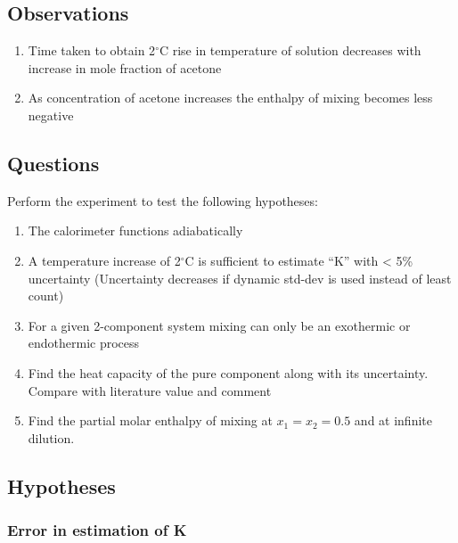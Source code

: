 \documentclass[11pt]{article}
\providecommand{\tightlist}{%
      \setlength{\itemsep}{0pt}\setlength{\parskip}{0pt}}
\begin{document}
\hypertarget{observations}{%
  \subsection{Observations}\label{observations}}

\begin{enumerate}
  \def\labelenumi{\arabic{enumi}.}
  \tightlist
  \item
        Time taken to obtain 2\(^{\circ}\)C rise in temperature of solution
        decreases with increase in mole fraction of acetone
  \item
        As concentration of acetone increases the enthalpy of mixing becomes
        less negative
\end{enumerate}

\hypertarget{questions}{%
  \subsection{Questions}\label{questions}}

Perform the experiment to test the following hypotheses:

\begin{enumerate}
  \def\labelenumi{\arabic{enumi}.}
  \tightlist
  \item
        The calorimeter functions adiabatically
  \item
        A temperature increase of 2\(^{\circ}\)C is sufficient to estimate
        ``K'' with \textless{} 5\% uncertainty (Uncertainty decreases if
        dynamic std-dev is used instead of least count)
  \item
        For a given 2-component system mixing can only be an exothermic or
        endothermic process
  \item
        Find the heat capacity of the pure component along with its
        uncertainty. Compare with literature value and comment
  \item
        Find the partial molar enthalpy of mixing at \(x_1=x_2=0.5\) and at
        infinite dilution.
\end{enumerate}

\hypertarget{hypotheses}{%
  \subsection{Hypotheses}\label{hypotheses}}

\hypertarget{error-in-estimation-of-k}{%
  \subsubsection{Error in estimation of
    K}\label{error-in-estimation-of-k}}
\end{document}
